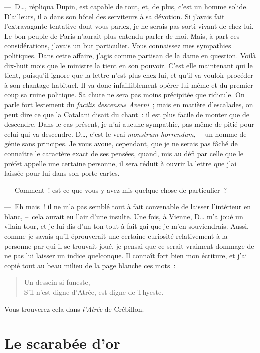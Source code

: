 \documentclass[french,twoside]{book} %
\begin{document}
— D…, répliqua Dupin, est capable de tout, et, de plus, c’est un homme solide. D’ailleurs, il a dans son hôtel des serviteurs à sa dévotion. Si j’avais fait l’extravagante tentative dont vous parlez, je ne serais pas sorti vivant de chez lui. Le bon peuple de Paris n’aurait plus entendu parler de moi. Mais, à part ces considérations, j’avais un but particulier. Vous connaissez mes sympathies politiques. Dans cette affaire, j’agis comme partisan de la dame en question. Voilà dix-huit mois que le ministre la tient en son pouvoir. C’est elle maintenant qui le tient, puisqu’il ignore que la lettre n’est plus chez lui, et qu’il va vouloir procéder à son chantage habituel. Il va donc infailliblement opérer lui-même et du premier coup sa ruine politique. Sa chute ne sera pas moins précipitée que ridicule. On parle fort lestement du \emph{facilis descensus Averni} ; mais en matière d’escalades, on peut dire ce que la Catalani disait du chant : il est plus facile de monter que de descendre. Dans le cas présent, je n’ai aucune sympathie, pas même de pitié pour celui qui va descendre. D…, c’est le vrai \emph{monstrum horrendum}, – un homme de génie sans principes. Je vous avoue, cependant, que je ne serais pas fâché de connaître le caractère exact de ses pensées, quand, mis au défi par celle que le préfet appelle une certaine personne, il sera réduit à ouvrir la lettre que j’ai laissée pour lui dans son porte-cartes.\par
— Comment ! est-ce que vous y avez mis quelque chose de particulier ?\par
— Eh mais ! il ne m’a pas semblé tout à fait convenable de laisser l’intérieur en blanc, – cela aurait eu l’air d’une insulte. Une fois, à Vienne, D… m’a joué un vilain tour, et je lui dis d’un ton tout à fait gai que je m’en souviendrais. Aussi, comme je savais qu’il éprouverait une certaine curiosité relativement à la personne par qui il se trouvait joué, je pensai que ce serait vraiment dommage de ne pas lui laisser un indice quelconque. Il connaît fort bien mon écriture, et j’ai copié tout au beau milieu de la page blanche ces mots :\par


\begin{verse}
Un dessein si funeste,\\
S’il n’est digne d’Atrée, est digne de Thyeste.\\
\end{verse}

\noindent Vous trouverez cela dans \emph{l’Atrée} de Crébillon.
\section[{Le scarabée d’or}]{Le scarabée d’or}\renewcommand{\leftmark}{Le scarabée d’or}
\end{document}
